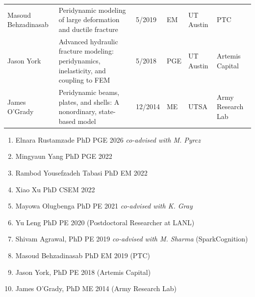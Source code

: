 {\begin{center}
\begin{longtable}{p{1.7cm}p{6.5cm}P{1.2cm}P{1.2cm}P{1.2cm}p{2.0cm}}
      Masoud Behzadinasab & Peridynamic modeling of large deformation and ductile fracture & 5/2019 & EM & UT Austin & PTC \\
      Jason York & Advanced hydraulic fracture modeling: peridynamics, inelasticity, and coupling to FEM & 5/2018 & PGE & UT Austin & Artemis Capital \\
      James O'Grady & Peridynamic beams, plates, and shells: A nonordinary, state-based model & 12/2014 & ME & UTSA & Army Research Lab \\
      \bottomrule
    \end{longtable}
  \end{center}
}
\else
\begin{enumerate}
    \item Elnara Rustamzade PhD PGE 2026 \emph{co-advised with M. Pyrcz}
    \item Mingyaun Yang PhD PGE 2022
    \item Rambod Yousefzadeh Tabasi PhD EM 2022
    \item Xiao Xu PhD CSEM 2022
    \item Mayowa Olugbenga PhD PE 2021 \emph{co-advised with K. Gray} 
    \item Yu Leng PhD PE 2020 (Postdoctoral Researcher at LANL)
    \item Shivam Agrawal, PhD PE 2019 \emph{co-advised with M. Sharma} (SparkCognition)
    \item Masoud Behzadinasab PhD EM 2019 (PTC)
    \item Jason York, PhD PE 2018 (Artemis Capital) 
    \item James O'Grady, PhD ME 2014 (Army Research Lab)
\end{enumerate}
\fi


